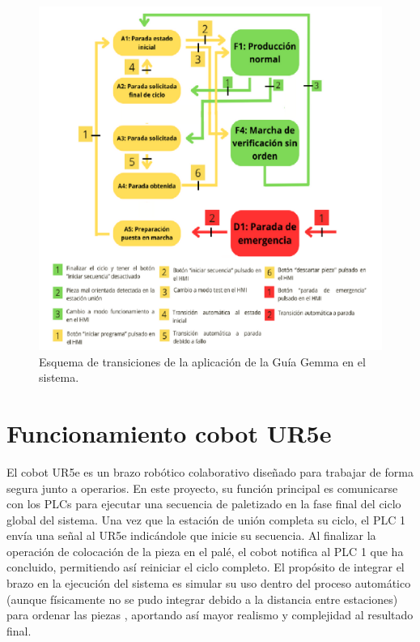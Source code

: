 \begin{figure}[h!]
  \begin{center}
  	\includegraphics[width=16.5cm]{figs/guia_gemma_final}
  \end{center}
  \caption{\centering Esquema de transiciones de la aplicación de la Guía Gemma en el sistema.}
  \label{fig:guia_gemma_final}
\end{figure}

\clearpage

\section{Funcionamiento cobot UR5e}
\label{sec:funcionamiento_ur5e}

El cobot UR5e es un brazo robótico colaborativo diseñado para trabajar de forma segura junto a operarios. En este proyecto, su función principal es comunicarse con los PLCs para ejecutar una secuencia de paletizado en la fase final del ciclo global del sistema. Una vez que la estación de unión completa su ciclo, el PLC 1 envía una señal al UR5e indicándole que inicie su secuencia. Al finalizar la operación de colocación de la pieza en el palé, el cobot notifica al PLC 1 que ha concluido, permitiendo así reiniciar el ciclo completo. El propósito de integrar el brazo en la ejecución del sistema es simular su uso dentro del proceso automático (aunque físicamente no se pudo integrar debido a la distancia entre estaciones) para ordenar las piezas , aportando así mayor realismo y complejidad al resultado final. 

